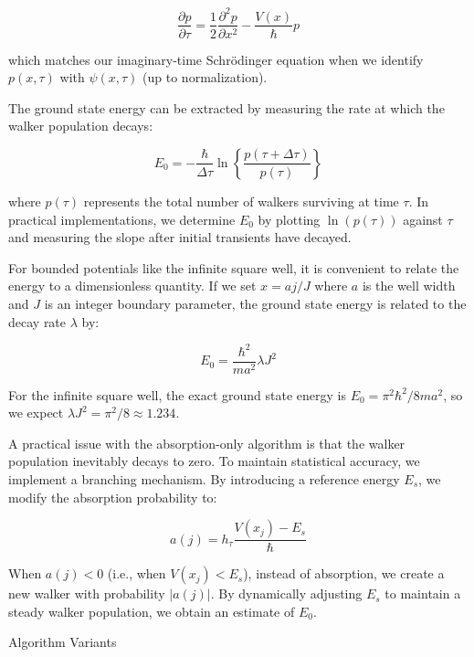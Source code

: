 \documentclass[reqno]{amsart}
\makeatletter
\renewcommand\subsection{\@startsection{subsection}{2}%
  \z@{.5\linespacing\@plus.7\linespacing}{-.5em}%
  {\normalfont\scshape\justify}}
\numberwithin{equation}{section}
\numberwithin{figure}{section}
\makeatother
\begin{document}
\begin{equation}
\frac{\partial p}{\partial \tau} = \frac{1}{2}\frac{\partial^2 p}{\partial x^2} - \frac{V(x)}{\hbar}p
\end{equation}

which matches our imaginary-time Schrödinger equation when we identify $p(x,\tau)$ with $\psi(x,\tau)$ (up to normalization).

The ground state energy can be extracted by measuring the rate at which the walker population decays:

\begin{equation}
E_0 = -\frac{\hbar}{\Delta\tau}\ln\left\{\frac{p(\tau+\Delta\tau)}{p(\tau)}\right\}
\end{equation}

where $p(\tau)$ represents the total number of walkers surviving at time $\tau$. In practical implementations, we determine $E_0$ by plotting $\ln(p(\tau))$ against $\tau$ and measuring the slope after initial transients have decayed.

For bounded potentials like the infinite square well, it is convenient to relate the energy to a dimensionless quantity. If we set $x = aj/J$ where $a$ is the well width and $J$ is an integer boundary parameter, the ground state energy is related to the decay rate $\lambda$ by:

\begin{equation}
E_0 = \frac{\hbar^2}{ma^2}\lambda J^2
\end{equation}

For the infinite square well, the exact ground state energy is $E_0 = \pi^2\hbar^2/8ma^2$, so we expect $\lambda J^2 = \pi^2/8 \approx 1.234$.

A practical issue with the absorption-only algorithm is that the walker population inevitably decays to zero. To maintain statistical accuracy, we implement a branching mechanism. By introducing a reference energy $E_s$, we modify the absorption probability to:

\begin{equation}
a(j) = h_\tau \frac{V(x_j) - E_s}{\hbar}
\end{equation}

When $a(j) < 0$ (i.e., when $V(x_j) < E_s$), instead of absorption, we create a new walker with probability $|a(j)|$. By dynamically adjusting $E_s$ to maintain a steady walker population, we obtain an estimate of $E_0$.

\subsection{Algorithm Variants}
\end{document}
